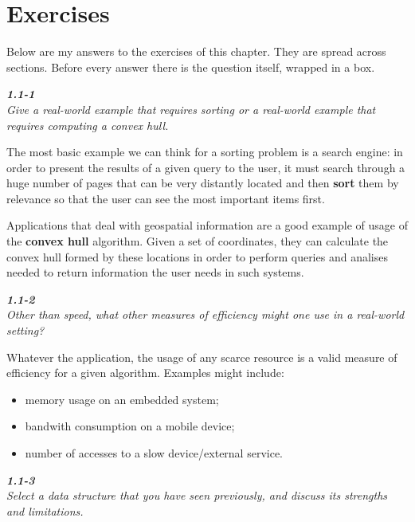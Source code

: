 \documentclass[8pt,a4paper]{article}
\begin{document}
\section*{Exercises}
Below are my answers to the exercises of this chapter. They are spread across
sections. Before every answer there is the question itself, wrapped in a box.

\begin{framed}
\textbf{\textit{1.1-1}} \\
\textit{Give a real-world example that requires sorting or a real-world example that
requires computing a convex hull.}
\end{framed}

The most basic example we can think for a sorting problem is a search engine: in order
to present the results of a given query to the user, it must search through a huge number
of pages that can be very distantly located and then \textbf{sort} them by relevance
so that the user can see the most important items first.

Applications that deal with geospatial information are a good example of usage of the
\textbf{convex hull} algorithm. Given a set of coordinates, they can calculate the
convex hull formed by these locations in order to perform queries and analises
needed to return information the user needs in such systems.

\begin{framed}
\textbf{\textit{1.1-2}} \\
\textit{Other than speed, what other measures of efficiency might one use in a real-world
setting?}
\end{framed}

Whatever the application, the usage of any scarce resource is a valid measure of efficiency
for a given algorithm. Examples might include:

\begin{itemize}
  \item memory usage on an embedded system;
  \item bandwith consumption on a mobile device;
  \item number of accesses to a slow device/external service.
\end{itemize}

\begin{framed}
\textbf{\textit{1.1-3}} \\
\textit{Select a data structure that you have seen previously, and discuss its strengths
and limitations.}
\end{framed}
\end{document}
